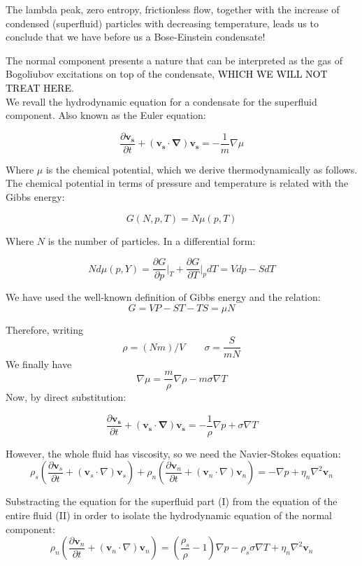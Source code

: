 \documentclass{article}
\newcommand{\black}{\textcolor{black}}
\begin{document}
The lambda peak, zero entropy, frictionless flow, together with the increase of condensed (superfluid) particles with decreasing temperature, leads us to conclude that we have before us a Bose-Einstein condensate!

The normal component presents a nature that can be interpreted as the gas of Bogoliubov excitations on top of the condensate, \black{WHICH WE WILL NOT TREAT HERE}.
\\

We revall the hydrodynamic equation for a condensate for the superfluid component. Also known as the Euler equation: 

\[\frac{\partial \mathbf{v_s}}{\partial t} + (\mathbf{v_s}\cdot \mathbf{\nabla})\mathbf{v_s} = -\frac{1}{m}\nabla \mu\]

Where $\mu$ is the chemical potential, which we derive thermodynamically as follows. The chemical potential in terms of pressure and temperature is related with the Gibbs energy:

\[G(N, p, T)= N \mu(p, T)\]

Where $N$ is the number of particles. In a differential form:

\[N d\mu(p, Y) = \frac{\partial G}{\partial p} \bigg|_T + \frac{\partial G}{\partial T}\bigg|_pdT = Vdp - S dT\]

We have used the well-known definition of Gibbs energy and the relation:
\[G = VP - ST - TS = \mu N\]

Therefore, writing 
\[\rho = (Nm)/V \qquad \sigma = \frac{S}{mN}\]
We finally have
\[\nabla \mu = \frac{m}{\rho} \nabla \rho - m \sigma \nabla T\]
Now, by direct substitution:

\[\frac{\partial \mathbf{v_s}}{\partial t} + (\mathbf{v_s}\cdot \mathbf{\nabla})\mathbf{v_s} = -\frac{1}{\rho}\nabla p + \sigma \nabla T \tag{I}\]

However, the whole fluid has viscosity, so we need the Navier-Stokes equation:
\[
\rho_s \left( \frac{\partial \mathbf{v}_s}{\partial t} + (\mathbf{v}_s \cdot \nabla) \mathbf{v}_s \right) + \rho_n \left( \frac{\partial \mathbf{v}_n}{\partial t} + (\mathbf{v}_n \cdot \nabla) \mathbf{v}_n \right) = -\nabla p + \eta_n \nabla^2 \mathbf{v}_n \tag{II}
\]

Substracting the equation for the superfluid part (I) from the equation of the entire fluid (II) in order to isolate the hydrodynamic equation of the normal component:
\[
\rho_n \left( \frac{\partial \mathbf{v}_n}{\partial t} + (\mathbf{v}_n \cdot \nabla) \mathbf{v}_n \right) = \left( \frac{\rho_s}{\rho} - 1 \right) \nabla p - \rho_s \sigma \nabla T + \eta_n \nabla^2 \mathbf{v}_n \]
\end{document}
